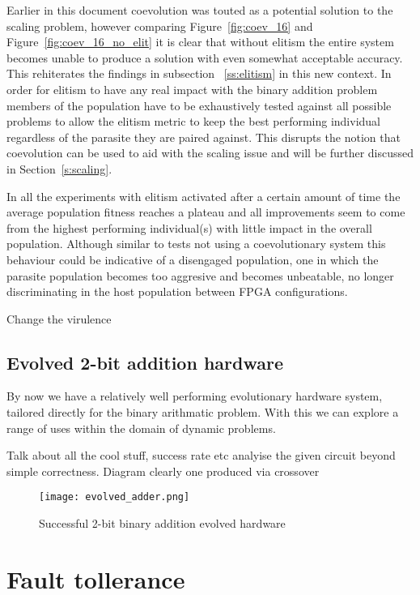 Earlier in this document coevolution was touted as a potential solution to the scaling
problem, however comparing Figure~\ref{fig:coev_16} and Figure~\ref{fig:coev_16_no_elit}
it is clear that without elitism the entire system becomes unable to produce a solution
with even somewhat acceptable accuracy. This rehiterates the findings in subsection
~\ref{ss:elitism} in this new context. In order for elitism to have any real impact
with the binary addition problem members of the population have to be exhaustively tested
against all possible problems to allow the elitism metric to keep the best performing
individual regardless of the parasite they are paired against. This disrupts the
notion that coevolution can be used to aid with the scaling issue and will be further
discussed in Section~\ref{s:scaling}.

In all the experiments with elitism activated after
a certain amount of time the average population
fitness reaches a plateau and all improvements seem to come from the highest performing
individual(s) with little impact in the overall population. Although similar to
tests not using a coevolutionary system this behaviour could be indicative
of a disengaged population, one in which the parasite population becomes too aggresive
and becomes unbeatable, no longer discriminating in the host population between FPGA
configurations.

\todo Change the virulence

\subsection{Evolved 2-bit addition hardware}
By now we have a relatively well performing evolutionary hardware system,
tailored directly for the binary arithmatic problem. With this we can explore
a range of uses within the domain of dynamic problems.

Talk about all the cool stuff, success rate etc analyise the given circuit
beyond simple correctness. Diagram clearly one produced via crossover

\begin{figure}
	\centering
	\texttt{[image: evolved\_adder.png]}
	\caption{Successful 2-bit binary addition evolved hardware}
	\label{fig:2-bit}
\end{figure}

\section{Fault tollerance}

